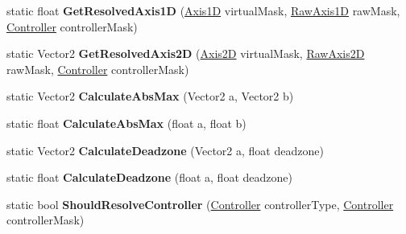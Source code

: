\begin{DoxyCompactItemize}
\item 
\mbox{\label{class_o_v_r_input_a9a5d2247797ff6fd085c579c1d075a17}} 
static float {\bfseries Get\+Resolved\+Axis1D} (\mbox{\hyperlink{class_o_v_r_input_af5c3e63489ca9ee2e5db3a657f7f27f6}{Axis1D}} virtual\+Mask, \mbox{\hyperlink{class_o_v_r_input_a9c9eff2910ca07d1fb0e924273ebefaf}{Raw\+Axis1D}} raw\+Mask, \mbox{\hyperlink{class_o_v_r_input_a5c86f9052a9cbb0b73779ff5704d60a8}{Controller}} controller\+Mask)
\item 
\mbox{\label{class_o_v_r_input_a8640bc6ebc25c819eeb01f095eea37c9}} 
static Vector2 {\bfseries Get\+Resolved\+Axis2D} (\mbox{\hyperlink{class_o_v_r_input_a8d8de8321e36e4c5c3b5266b72468d8a}{Axis2D}} virtual\+Mask, \mbox{\hyperlink{class_o_v_r_input_a973c161bfb3bd6d0cc16c3a0b56c9f4a}{Raw\+Axis2D}} raw\+Mask, \mbox{\hyperlink{class_o_v_r_input_a5c86f9052a9cbb0b73779ff5704d60a8}{Controller}} controller\+Mask)
\item 
\mbox{\label{class_o_v_r_input_a7ac39b258dfcd5211ea8d715b7ab92bc}} 
static Vector2 {\bfseries Calculate\+Abs\+Max} (Vector2 a, Vector2 b)
\item 
\mbox{\label{class_o_v_r_input_a37a0aed7362eb2f06ff34edfe10fe703}} 
static float {\bfseries Calculate\+Abs\+Max} (float a, float b)
\item 
\mbox{\label{class_o_v_r_input_aabb9b7e761b09248e0c74c2fd701422d}} 
static Vector2 {\bfseries Calculate\+Deadzone} (Vector2 a, float deadzone)
\item 
\mbox{\label{class_o_v_r_input_a05a0d7dd070ea39869226080f1ea3264}} 
static float {\bfseries Calculate\+Deadzone} (float a, float deadzone)
\item 
\mbox{\label{class_o_v_r_input_adc7c86ad410c6bfd641c8dc72fd05813}} 
static bool {\bfseries Should\+Resolve\+Controller} (\mbox{\hyperlink{class_o_v_r_input_a5c86f9052a9cbb0b73779ff5704d60a8}{Controller}} controller\+Type, \mbox{\hyperlink{class_o_v_r_input_a5c86f9052a9cbb0b73779ff5704d60a8}{Controller}} controller\+Mask)
\end{DoxyCompactItemize}
